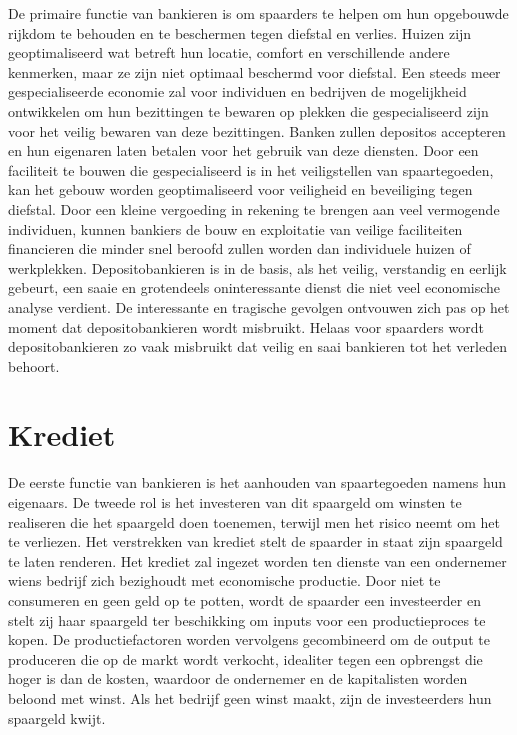 De primaire functie van bankieren is om spaarders te helpen om hun opgebouwde rijkdom te behouden en te beschermen tegen diefstal en verlies. Huizen zijn geoptimaliseerd wat betreft hun locatie, comfort en verschillende andere kenmerken, maar ze zijn niet optimaal beschermd voor diefstal. Een steeds meer gespecialiseerde economie zal voor individuen en bedrijven de mogelijkheid ontwikkelen om hun bezittingen te bewaren op plekken die gespecialiseerd zijn voor het veilig bewaren van deze bezittingen. Banken zullen deposito\textquotesingle s accepteren en hun eigenaren laten betalen voor het gebruik van deze diensten. Door een faciliteit te bouwen die gespecialiseerd is in het veiligstellen van spaartegoeden, kan het gebouw worden geoptimaliseerd voor veiligheid en beveiliging tegen diefstal. Door een kleine vergoeding in rekening te brengen aan veel vermogende individuen, kunnen bankiers de bouw en exploitatie van veilige faciliteiten financieren die minder snel beroofd zullen worden dan individuele huizen of werkplekken. Depositobankieren is in de basis, als het veilig, verstandig en eerlijk gebeurt, een saaie en grotendeels oninteressante dienst die niet veel economische analyse verdient. De interessante en tragische gevolgen ontvouwen zich pas op het moment dat depositobankieren wordt misbruikt. Helaas voor spaarders wordt depositobankieren zo vaak misbruikt dat veilig en saai bankieren tot het verleden behoort.

\hypertarget{krediet}{%
\section{Krediet}\label{krediet}}

De eerste functie van bankieren is het aanhouden van spaartegoeden namens hun eigenaars. De tweede rol is het investeren van dit spaargeld om winsten te realiseren die het spaargeld doen toenemen, terwijl men het risico neemt om het te verliezen. Het verstrekken van krediet stelt de spaarder in staat zijn spaargeld te laten renderen. Het krediet zal ingezet worden ten dienste van een ondernemer wiens bedrijf zich bezighoudt met economische productie. Door niet te consumeren en geen geld op te potten, wordt de spaarder een investeerder en stelt zij haar spaargeld ter beschikking om inputs voor een productieproces te kopen. De productiefactoren worden vervolgens gecombineerd om de output te produceren die op de markt wordt verkocht, idealiter tegen een opbrengst die hoger is dan de kosten, waardoor de ondernemer en de kapitalisten worden beloond met winst. Als het bedrijf geen winst maakt, zijn de investeerders hun spaargeld kwijt.

